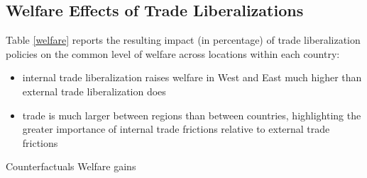 \documentclass[11pt]{article}
\begin{document}
\subsection*{Welfare Effects of Trade Liberalizations}
Table \ref{welfare} reports the resulting impact (in percentage) of trade liberalization policies on the common level of welfare across locations within each country:
\begin{itemize}
\item internal trade liberalization raises welfare in West and East much higher than external trade liberalization does
\item  trade is much larger between regions than between countries, highlighting the greater importance of internal trade frictions relative to external trade frictions
\end{itemize}

\begin{table}[H]
\centering
\caption{Counterfactuals Welfare gains}
\label{welfare}

\end{table}
\end{document}
